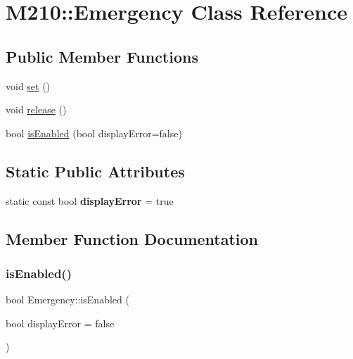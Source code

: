 \hypertarget{class_m210_1_1_emergency}{}\section{M210\+:\+:Emergency Class Reference}
\label{class_m210_1_1_emergency}
\subsection*{Public Member Functions}
\begin{DoxyCompactItemize}
\item 
void \mbox{\hyperlink{class_m210_1_1_emergency_aa461736b60192940860a5f71839049b5}{set}} ()
\item 
void \mbox{\hyperlink{class_m210_1_1_emergency_a44add09d4d5016a54ffb714e468a40ac}{release}} ()
\item 
bool \mbox{\hyperlink{class_m210_1_1_emergency_a071e3eb6d67ee647b9d1aa9442f253e2}{is\+Enabled}} (bool display\+Error=false)
\end{DoxyCompactItemize}
\subsection*{Static Public Attributes}
\begin{DoxyCompactItemize}
\item 
\mbox{\label{class_m210_1_1_emergency_a8282c33e7103d30584832fb20357e844}} 
static const bool {\bfseries display\+Error} = true
\end{DoxyCompactItemize}


\subsection{Member Function Documentation}
\mbox{\label{class_m210_1_1_emergency_a071e3eb6d67ee647b9d1aa9442f253e2}} 
\subsubsection{\texorpdfstring{is\+Enabled()}{isEnabled()}}
{\footnotesize\ttfamily bool Emergency\+::is\+Enabled (\begin{DoxyParamCaption}\item[{bool}]{display\+Error = {\ttfamily false} }\end{DoxyParamCaption})}

